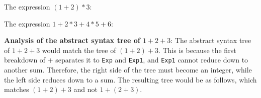 \documentclass{article}
\theoremstyle{theorem}
\theoremstyle{definition}
\theoremstyle{remark}
\begin{document}
The expression $(1+2)*3$:\newline

\hfil
{}
\hfil

\newpage
The expression $1+2*3+4*5+6$:\newline

\hfil
{}
\hfil

\noindent \textbf{Analysis of the abstract syntax tree of $1+2+3$}:
The abstract syntax tree of $1+2+3$ would match the tree of $(1+2)+3$. This is because the first breakdown of $+$ separates it to \texttt{Exp} and \texttt{Exp1}, and \texttt{Exp1} cannot reduce down to another sum. Therefore, the right side of the tree must become an integer, while the left side reduces down to a sum. The resulting tree would be as follows, which matches $(1+2)+3$ and not $1+(2+3)$.
\end{document}
